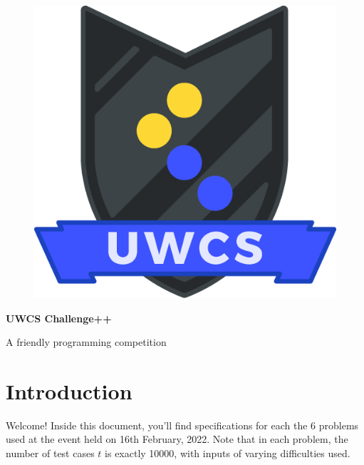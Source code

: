 \documentclass[a4paper,12pt,parskip=half-]{scrartcl}
\begin{document}
\begin{figure}
    \vspace{-10pt} %
    \includegraphics[width=0.8\linewidth]{shield.png} %
    \vspace{-100pt} %
\end{figure}

\normalfont \Huge \bfseries UWCS Challenge++

\normalfont\Large A friendly programming competition
\normalsize

\section*{Introduction}

Welcome! 
Inside this document, you'll find specifications for each the 6 problems used at the event held on 16th February, 2022. Note that in each problem, the number of test cases $t$ is exactly 10000, with inputs of varying difficulties used.

\tableofcontents

\newpage



\newpage

\newpage

% 
% 
% 





% 
% 
% 
% 
% 
\end{document}
